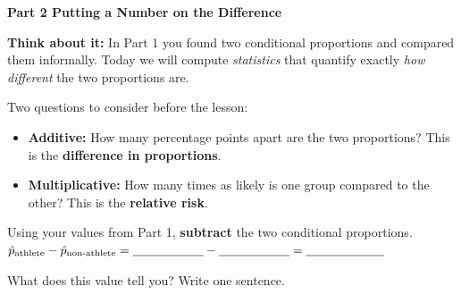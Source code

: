 \documentclass[10pt]{article}
\begin{document}
\vspace{0.28in}

{\large\bfseries\color{navy} Part 2 \quad Putting a Number on the Difference}

\vspace{0.12in}

\begin{tcolorbox}[colback=greenbg, colframe=greenacc, boxrule=0.8pt, arc=2mm,
    left=4mm, right=4mm, top=3mm, bottom=3mm]
    \small
    \textbf{Think about it:} In Part 1 you found two conditional proportions and compared
    them informally. Today we will compute \emph{statistics} that quantify exactly
    \emph{how different} the two proportions are.

    \vspace{6pt}
    Two questions to consider before the lesson:
    \begin{itemize}[leftmargin=1.3em, itemsep=6pt]
        \item \textbf{Additive:} How many percentage points apart are the two proportions?
              This is the \textbf{difference in proportions}.
        \item \textbf{Multiplicative:} How many times as likely is one group compared to the other?
              This is the \textbf{relative risk}.
    \end{itemize}
\end{tcolorbox}

\vspace{0.14in}

\noindent Using your values from Part 1, \textbf{subtract} the two conditional proportions.\\[8pt]
$\hat{p}_{\text{athlete}} - \hat{p}_{\text{non-athlete}} = \blank{2cm} - \blank{2cm} = \blank{2.2cm}$

\vspace{0.1in}

\noindent What does this value tell you? Write one sentence.\\[8pt]
\writeline\\[2pt]\writeline
\end{document}
